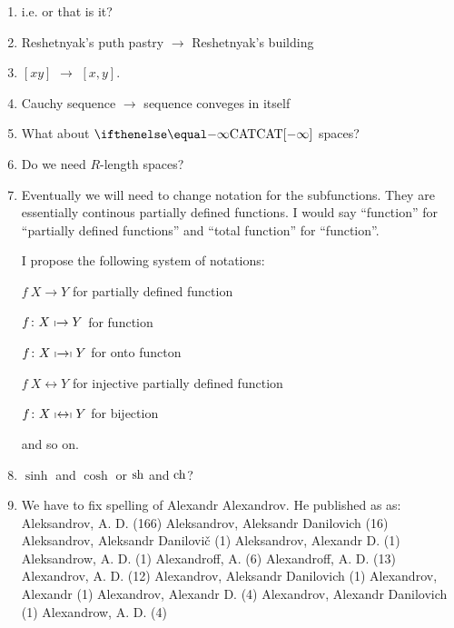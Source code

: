 \begin{enumerate}
\item i.e. or that is it?

\item Reshetnyak's puth pastry $\to$ Reshetnyak's building

\item $[xy]$ $\to$ $[x,y]$.

\item Cauchy sequence $\to$ sequence conveges in itself

\item What about $\CAT{-\infty}$ spaces?

\item Do we need $R$-length spaces?

\item Eventually we will need to change notation for the subfunctions.
They are essentially continous partially defined functions.
I would say ``function'' for ``partially defined functions''
and ``total function'' for ``function''.

I propose the following system of notations:

$f\:X\to Y$ for partially defined function

$f\:X\shortmid\to Y$ for function       

$f\:X\shortmid\to\shortmid Y$     for onto functon

$f\:X\leftrightarrow Y$      for injective partially defined function

$f\:X\shortmid\leftrightarrow\shortmid Y$     for bijection

and so on.

\item $\sinh$ and $\cosh$ or $\mathop{\rm  sh}$ and $\mathop{\rm  ch}$?

\item We have to fix spelling of Alexandr Alexandrov. He published as as: 
Aleksandrov, A. D. (166)
Aleksandrov, Aleksandr Danilovich (16)
     Aleksandrov, Aleksandr Danilovič (1)
     Aleksandrov, Alexandr D. (1)
     Aleksandrow, A. D. (1)
     Alexandroff, A. (6)
     Alexandroff, A. D. (13)
     Alexandrov, A. D. (12)
     Alexandrov, Aleksandr Danilovich (1)
     Alexandrov, Alexandr (1)
     Alexandrov, Alexandr D. (4)
     Alexandrov, Alexandr Danilovich (1)
     Alexandrow, A. D. (4)

\end{enumerate}

